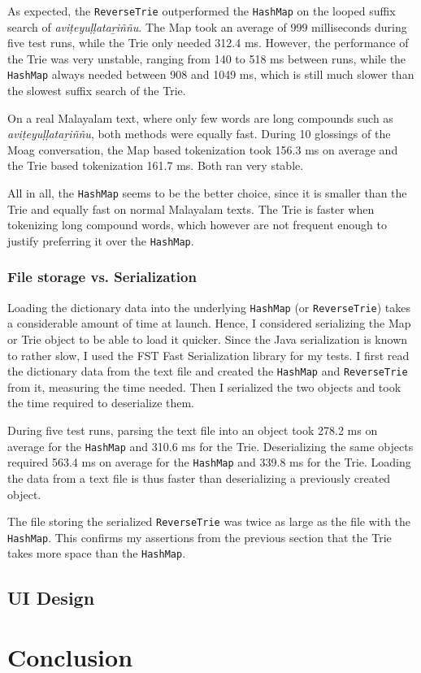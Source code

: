 \documentclass[a4paper]{article}
\newcommand{\typ}[1]{\texttt{#1}}
\begin{document}
As expected, the \typ{ReverseTrie} outperformed the \typ{HashMap} on the looped suffix search of \textit{aviṭeyuḷḷataṟiññu}. The Map took an average of 999 milliseconds during five test runs, while the Trie only needed 312.4 ms. However, the performance of the Trie was very unstable, ranging from 140 to 518 ms between runs, while the \typ{HashMap} always needed between 908 and 1049 ms, which is still much slower than the slowest suffix search of the Trie.

On a real Malayalam text, where only few words are long compounds such as \textit{aviṭeyuḷḷataṟiññu}, both methods were equally fast. During 10 glossings of the Moag conversation, the Map based tokenization took 156.3 ms on average and the Trie based tokenization 161.7 ms. Both ran very stable.

All in all, the \typ{HashMap} seems to be the better choice, since it is smaller than the Trie and equally fast on normal Malayalam texts. The Trie is faster when tokenizing long compound words, which however are not frequent enough to justify preferring it over the \typ{HashMap}.

\subsubsection*{File storage vs. Serialization}

Loading the dictionary data into the underlying \typ{HashMap} (or \typ{ReverseTrie}) takes a considerable amount of time at launch. Hence, I considered serializing the Map or Trie object to be able to load it quicker. Since the Java serialization is known to rather slow, I used the FST Fast Serialization library for my tests. I first read the dictionary data from the text file and created the \typ{HashMap} and \typ{ReverseTrie} from it, measuring the time needed. Then I serialized the two objects and took the time required to deserialize them.

During five test runs, parsing the text file into an object took 278.2 ms on average for the \typ{HashMap} and 310.6 ms for the Trie. Deserializing the same objects required 563.4 ms on average for the \typ{HashMap} and 339.8 ms for the Trie. Loading the data from a text file is thus faster than deserializing a previously created object.

The file storing the serialized \typ{ReverseTrie} was twice as large as the file with the \typ{HashMap}. This confirms my assertions from the previous section that the Trie takes more space than the \typ{HashMap}.


\subsection{UI Design}

\section{Conclusion}

\printbibliography
\end{document}
